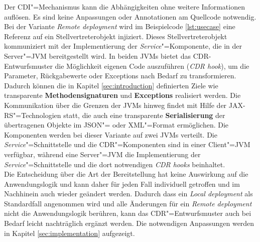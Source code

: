 Der \ac{CDI}"=Mechanismus kann die Abhängigkeiten ohne weitere Informationen auflösen. Es sind keine Anpassungen oder Annotationen am Quellcode notwendig.\\
Bei der Variante \textit{Remote deployment} wird im Beispielcode \ref{lst:usecase} eine Referenz auf ein Stellvertreterobjekt injiziert. 
Dieses Stellvertreterobjekt kommuniziert mit der Implementierung der \textit{Service}"=Komponente, die in der Server"=JVM bereitgestellt wird. 
In beiden \ac{JVM}s bietet das \ac{CDR}-Entwurfsmuster die Möglichkeit eigenen Code auszuführen (\textit{CDR hook}), um die Parameter, Rückgabewerte oder Exceptions nach Bedarf zu transformieren. Dadurch können die in Kapitel \ref{sec:introduction} definierten Ziele wie transparente \textbf{Methodensignaturen} und \textbf{Exceptions} realisiert werden.
Die Kommunikation über die Grenzen der \ac{JVM}s hinweg findet mit Hilfe der \ac{JAX-RS}"=Technologien statt, die auch eine transparente \textbf{Serialisierung} der übertragenen Objekte im \ac{JSON}"= oder \ac{XML}"=Format ermöglichen.
Die Komponenten werden bei dieser Variante auf zwei \ac{JVM}s verteilt. 
Die \textit{Service}"=Schnittstelle und die \ac{CDR}"=Komponenten sind in einer Client"=JVM verfügbar, während eine Server"=JVM die Implementierung der \textit{Service}"=Schnittstelle und die dort notwendigen \textit{CDR hooks} beinhaltet.\\
Die Entscheidung über die Art der Bereitstellung hat keine Auswirkung auf die Anwendungslogik und kann daher für jeden Fall individuell getroffen und im Nachhinein auch wieder geändert werden.
Dadurch dass ein \textit{Local deployment} als Standardfall angenommen wird und alle Änderungen für ein \textit{Remote deployment} nicht die Anwendungslogik berühren, kann das \ac{CDR}"=Entwurfsmuster auch bei Bedarf leicht nachträglich ergänzt werden.
Die notwendigen Anpassungen werden in Kapitel \ref{sec:implementation} aufgezeigt.